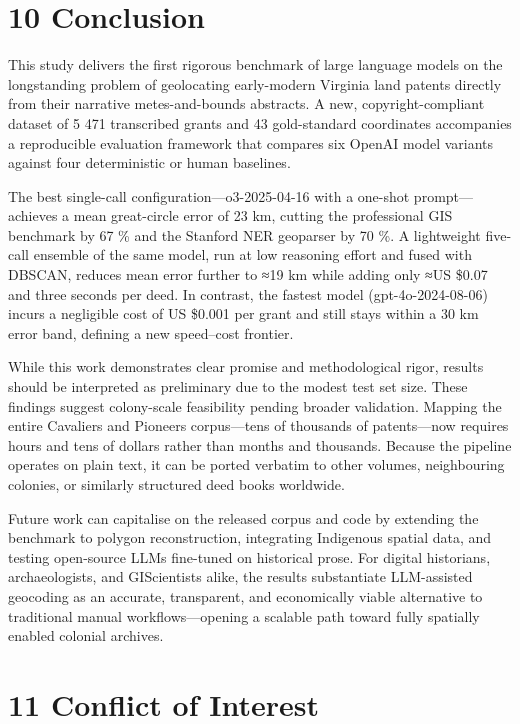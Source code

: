 \documentclass[
  10pt,
  twocolumn]{article}
\begin{document}
\section{10 Conclusion}\label{conclusion}

This study delivers the first rigorous benchmark of large language
models on the longstanding problem of geolocating early-modern Virginia
land patents directly from their narrative metes-and-bounds abstracts. A
new, copyright-compliant dataset of 5 471 transcribed grants and 43
gold-standard coordinates accompanies a reproducible evaluation
framework that compares six OpenAI model variants against four
deterministic or human baselines.

The best single-call configuration---o3-2025-04-16 with a one-shot
prompt---achieves a mean great-circle error of 23 km, cutting the
professional GIS benchmark by 67 \% and the Stanford NER geoparser by 70
\%. A lightweight five-call ensemble of the same model, run at low
reasoning effort and fused with DBSCAN, reduces mean error further to
≈19 km while adding only ≈US \$0.07 and three seconds per deed. In
contrast, the fastest model (gpt-4o-2024-08-06) incurs a negligible cost
of US \$0.001 per grant and still stays within a 30 km error band,
defining a new speed--cost frontier.

While this work demonstrates clear promise and methodological rigor,
results should be interpreted as preliminary due to the modest test set
size. These findings suggest colony-scale feasibility pending broader
validation. Mapping the entire Cavaliers and Pioneers corpus---tens of
thousands of patents---now requires hours and tens of dollars rather
than months and thousands. Because the pipeline operates on plain text,
it can be ported verbatim to other volumes, neighbouring colonies, or
similarly structured deed books worldwide.

Future work can capitalise on the released corpus and code by extending
the benchmark to polygon reconstruction, integrating Indigenous spatial
data, and testing open-source LLMs fine-tuned on historical prose. For
digital historians, archaeologists, and GIScientists alike, the results
substantiate LLM-assisted geocoding as an accurate, transparent, and
economically viable alternative to traditional manual
workflows---opening a scalable path toward fully spatially enabled
colonial archives.

\section{11 Conflict of Interest}\label{conflict-of-interest}
\end{document}
